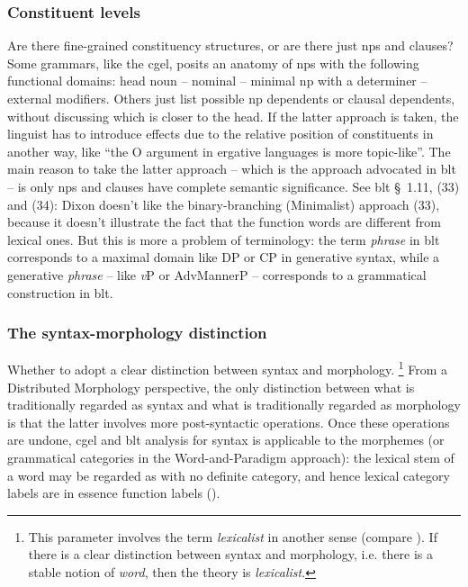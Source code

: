 \documentclass[UTF8, a4paper, oneside, scheme=plain]{ctexart}
\newcommand*{\citesec}[1]{\S~{#1}}
\newcommand*{\term}[1]{\emph{#1}}
\begin{document}
\subsubsection{Constituent levels}

Are there fine-grained constituency structures, or are there just \acl{np}s and clauses?
Some grammars, like the \ac{cgel}, 
posits an anatomy of \ac{np}s with the following functional domains:
head noun -- nominal -- minimal \ac{np} with a determiner -- external modifiers.
Others just list possible \ac{np} dependents or clausal dependents,
without discussing which is closer to the head. 
If the latter approach is taken,
the linguist has to introduce effects due to the relative position of constituents in another way,
like ``the O argument in ergative languages is more topic-like''.
The main reason to take the latter approach -- which is the approach advocated in \ac{blt} --
is only \ac{np}s and clauses have complete semantic significance.
See \ac{blt} \citesec{1.11}, (33) and (34):
Dixon doesn't like the binary-branching (Minimalist) approach (33),
because it doesn't illustrate the fact that the function words are different from lexical ones. 
But this is more a problem of terminology:
the term \term{phrase} in \ac{blt} corresponds to a maximal domain like DP or CP in generative syntax,
while a generative \term{phrase} -- like \term{v}P or AdvMannerP -- 
corresponds to a grammatical construction in \ac{blt}.

\subsubsection{The syntax-morphology distinction}

Whether to adopt a clear distinction between syntax and morphology.%
\footnote{
    This parameter involves the term \term{lexicalist} in another sense (compare ).
    If there is a clear distinction between syntax and morphology,
    i.e. there is a stable notion of \term{word},
    then the theory is \term{lexicalist}.
}
From a Distributed Morphology perspective,
the only distinction between what is traditionally regarded as syntax 
and what is traditionally regarded as morphology 
is that the latter involves more post-syntactic operations.
Once these operations are undone,
\ac{cgel} and \ac{blt} analysis for syntax is applicable to the morphemes
(or grammatical categories in the Word-and-Paradigm approach):
the lexical stem of a word may be regarded as with no definite category,
and hence lexical category labels are in essence function labels ().
\end{document}
